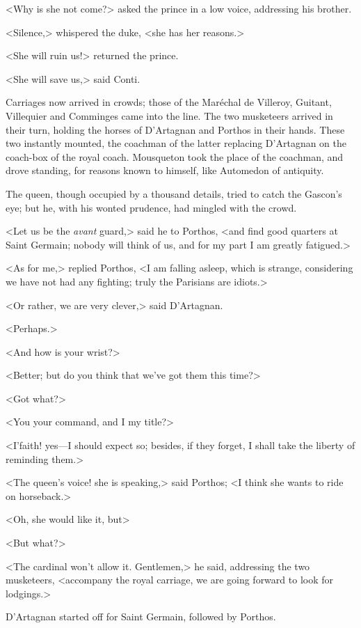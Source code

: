 <Why is she not come?> asked the prince in a low voice, addressing his brother.

<Silence,> whispered the duke, <she has her reasons.>

<She will ruin us!> returned the prince.

<She will save us,> said Conti.

Carriages now arrived in crowds; those of the Maréchal de Villeroy, Guitant, Villequier and Comminges came into the line. The two musketeers arrived in their turn, holding the horses of D'Artagnan and Porthos in their hands. These two instantly mounted, the coachman of the latter replacing D'Artagnan on the coach-box of the royal coach. Mousqueton took the place of the coachman, and drove standing, for reasons known to himself, like Automedon of antiquity.

The queen, though occupied by a thousand details, tried to catch the Gascon's eye; but he, with his wonted prudence, had mingled with the crowd.

<Let us be the \textit{avant} guard,> said he to Porthos, <and find good quarters at Saint Germain; nobody will think of us, and for my part I am greatly fatigued.>

<As for me,> replied Porthos, <I am falling asleep, which is strange, considering we have not had any fighting; truly the Parisians are idiots.>

<Or rather, we are very clever,> said D'Artagnan.

<Perhaps.>

<And how is your wrist?>

<Better; but do you think that we've got them this time?>

<Got what?>

<You your command, and I my title?>

<I'faith! yes—I should expect so; besides, if they forget, I shall take the liberty of reminding them.>

<The queen's voice! she is speaking,> said Porthos; <I think she wants to ride on horseback.>

<Oh, she would like it, but\longdash>

<But what?>

<The cardinal won't allow it. Gentlemen,> he said, addressing the two musketeers, <accompany the royal carriage, we are going forward to look for lodgings.>

D'Artagnan started off for Saint Germain, followed by Porthos.

